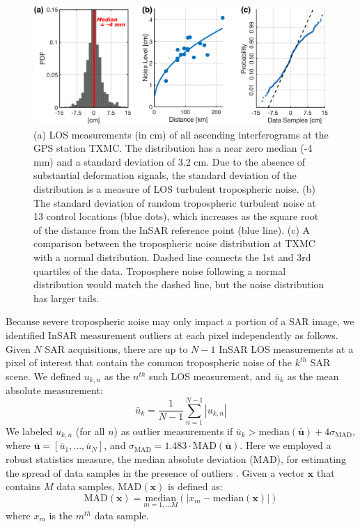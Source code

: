 \begin{figure}
	\centering
	\includegraphics[width=0.99\linewidth]{figures/chapter4-grl/outlier-top-only.pdf}
	\caption[Noise measurement and tropospheric outliers]{
		(a) LOS measurements (in cm) of all ascending interferograms at the GPS station TXMC. The distribution has a near zero median (-4 mm) and a standard deviation of 3.2 cm. Due to the absence of substantial deformation signals, the standard deviation of the distribution is a measure of LOS turbulent tropospheric noise. (b) The standard deviation of random tropospheric turbulent noise at 13 control locations (blue dots), which increases as the square root of the distance from the InSAR reference point (blue line). (c) A comparison between the tropospheric noise distribution at TXMC with a normal distribution. Dashed line connects the 1st and 3rd quartiles of the data. Troposphere noise following a normal distribution would match the dashed line, but the noise distribution has larger tails. 
	}
	\label{fig:ch4-outliers}
\end{figure}



Because severe tropospheric noise may only impact a portion of a SAR image, we identified InSAR measurement outliers at each pixel independently as follows. Given $N$ SAR acquisitions, there are up to $N-1$ InSAR LOS measurements at a pixel of interest that contain the common tropospheric noise of the $k^{th}$ SAR scene. We defined $u_{k,n}$ as the $n^{th}$ such LOS measurement, and $\bar{u}_k$ as the mean absolute measurement:
\begin{equation}
	\bar{u}_k  = \frac{1}{N-1} \sum_{n=1}^{N-1} |u_{k,n}|  
\end{equation}
We labeled $u_{k,n}$ (for all $n$) as outlier measurements if $\bar{u}_k > \mathrm{median}(\mathbf{\bar{u}}) + 4 \sigma_{\mathrm{MAD}}$, where $\mathbf{\bar{u}}=[\bar{u}_1,...,\bar{u}_N]$, and $\sigma_{\mathrm{MAD}}=1.483 \cdot \mathrm{MAD}(\mathbf{\bar{u}})$. Here we employed a robust statistics measure, the median absolute deviation (MAD), for estimating the spread of data samples in the presence of outliers \citep{Hampel1974InfluenceCurveIts, Rousseeuw2011RobustStatisticsOutlier}. Given a vector $\mathbf{x}$ that contains $M$ data samples, $\mathrm{MAD}(\mathbf{x})$ is defined as:
\begin{equation}
	\mathrm{MAD}(\mathbf{x}) =  \underset{m = 1,\ldots M}{\mathrm{median}} \left( \bigr\lvert  x_m - \mathrm{median}(\mathbf{x})  \bigr\rvert \right)
\end{equation}
where $x_m$ is the $m^{th}$ data sample. 



